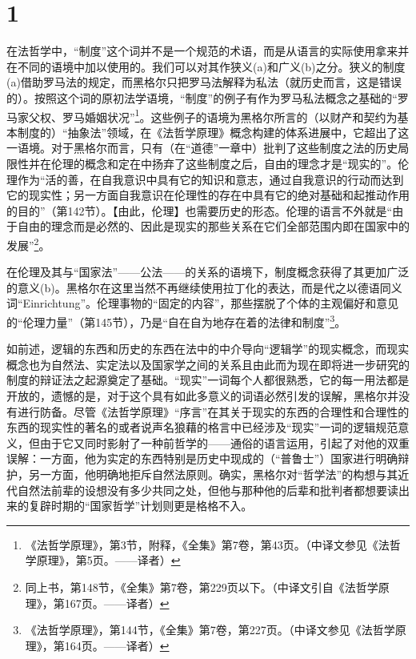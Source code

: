\section*{1}

在法哲学中，“制度”这个词并不是一个规范的术语，而是从语言的实际使用拿来并在不同的语境中加以使用的。我们可以对其作狭义(a)和广义(b)之分。狭义的制度(a)借助罗马法的规定，而黑格尔只把罗马法解释为私法（就历史而言，这是错误的）。按照这个词的原初法学语境，“制度”的例子有作为罗马私法概念之基础的“罗马家父权、罗马婚姻状况”\footnote{《法哲学原理》，第3节，附释，《全集》第7卷，第43页。（中译文参见《法哲学原理》，第5页。——译者）}。这些例子的语境为黑格尔所言的（以财产和契约为基本制度的）“抽象法”领域，在《法哲学原理》概念构建的体系进展中，它超出了这一语境。对于黑格尔而言，只有（在“道德”一章中）批判了这些制度之法的历史局限性并在伦理的概念和定在中扬弃了这些制度之后，自由的理念才是“现实的”。伦理作为“活的善，在自我意识中具有它的知识和意志，通过自我意识的行动而达到它的现实性；另一方面自我意识在伦理性的存在中具有它的绝对基础和起推动作用的目的”（第142节）。【由此，伦理】也需要历史的形态。伦理的语言不外就是“由于自由的理念而是必然的、因此是现实的那些关系在它们全部范围内即在国家中的发展”\footnote{同上书，第148节，《全集》第7卷，第229页以下。（中译文引自《法哲学原理》，第167页。——译者）}。

在伦理及其与“国家法”——公法——的关系的语境下，制度概念获得了其更加广泛的意义(b)。黑格尔在这里当然不再继续使用拉丁化的表达，而是代之以德语同义词“Einrichtung”。伦理事物的“固定的内容”，那些摆脱了个体的主观偏好和意见的“伦理力量”（第145节），乃是“自在自为地存在着的法律和制度”\footnote{《法哲学原理》，第144节，《全集》第7卷，第227页。（中译文参见《法哲学原理》，第164页。——译者）}。

如前述，逻辑的东西和历史的东西在法中的中介导向“逻辑学”的现实概念，而现实概念也为自然法、实定法以及国家学之间的关系且由此而为现在即将进一步研究的制度的辩证法之起源奠定了基础。“现实”一词每个人都很熟悉，它的每一用法都是开放的，遗憾的是，对于这个具有如此多意义的词语必然引发的误解，黑格尔并没有进行防备。尽管《法哲学原理》“序言”在其关于现实的东西的合理性和合理性的东西的现实性的著名的或者说声名狼藉的格言中已经涉及“现实”一词的逻辑规范意义，但由于它又同时影射了一种前哲学的——通俗的语言运用，引起了对他的双重误解：一方面，他为实定的东西特别是历史中现成的（“普鲁士”）国家进行明确辩护，另一方面，他明确地拒斥自然法原则。确实，黑格尔对“哲学法”的构想与其近代自然法前辈的设想没有多少共同之处，但他与那种他的后辈和批判者都想要读出来的复辟时期的“国家哲学”计划则更是格格不入。


